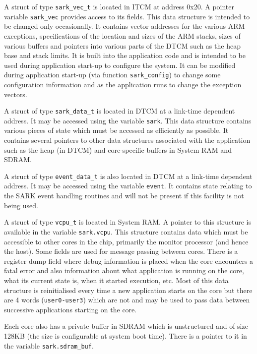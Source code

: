 A struct of type \texttt{sark\_vec\_t} is located in ITCM at address
0x20. A pointer variable \texttt{sark\_vec} provides access to its
fields. This data structure is intended to be changed only
occasionally. It contains vector addresses for the various ARM
exceptions, specifications of the location and sizes of the ARM
stacks, sizes of various buffers and pointers into various parts of
the DTCM such as the heap base and stack limits. It is built into the
application code and is intended to be used during application
start-up to configure the system. It can be modified during
application start-up (via function \texttt{sark\_config}) to change
some configuration information and as the application runs to change
the exception vectors.

A struct of type \texttt{sark\_data\_t} is located in DTCM at a
link-time dependent address. It may be accessed using the
variable \texttt{sark}.  This data structure contains various pieces
of state which must be accessed as efficiently as possible. It
contains several pointers to other data structures associated with the
application such as the heap (in DTCM) and core-specific buffers in
System RAM and SDRAM.

A struct of type \texttt{event\_data\_t} is also located in DTCM at a
link-time dependent address. It may be accessed using the
variable \texttt{event}. It contains state relating to the SARK event
handling routines and will not be present if this facility is not
being used.

A struct of type \texttt{vcpu\_t} is located in System RAM. A pointer
to this structure is available in the variable \texttt{sark.vcpu}.
This structure contains data which must be accessible to other cores
in the chip, primarily the monitor processor (and hence the
host). Some fields are used for message passing between cores. There
is a register dump field where debug information is placed when the
core encounters a fatal error and also information about what
application is running on the core, what its current state is, when it
started execution, etc. Most of this data structure is reinitialised
every time a new application starts on the core but there are 4 words
(\texttt{user0-user3}) which are not and may be used to pass data
between successive applications starting on the core.

Each core also has a private buffer in SDRAM which is unstructured and
of size 128KB (the size is configurable at system boot time). There is
a pointer to it in the variable \texttt{sark.sdram\_buf}.

